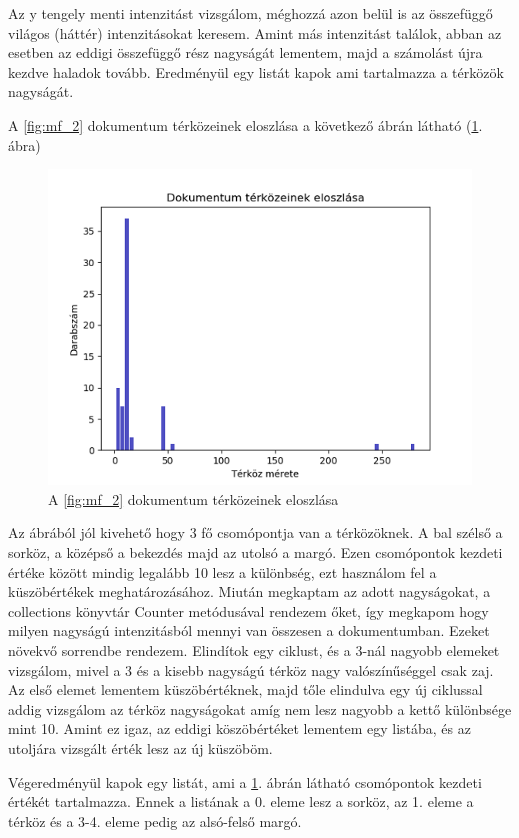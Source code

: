 Az y tengely menti intenzitást vizsgálom, méghozzá azon belül is az összefüggő világos (háttér) intenzitásokat keresem. Amint más intenzitást találok, abban az esetben az eddigi összefüggő rész nagyságát lementem, majd a számolást újra kezdve haladok tovább. Eredményül egy listát kapok ami tartalmazza a térközök nagyságát.

A \ref{fig:mf_2} dokumentum térközeinek eloszlása a következő ábrán látható (\ref{fig:spacing}. ábra)  

\begin{figure}[H]
\centering
\includegraphics[scale=1]{images/spacing.png}
\caption{A \ref{fig:mf_2} dokumentum térközeinek eloszlása}
\label{fig:spacing}
\end{figure}

Az ábrából jól kivehető hogy 3 fő csomópontja van a térközöknek. A bal szélső a sorköz, a középső a bekezdés majd az utolsó a margó. Ezen csomópontok kezdeti értéke között mindig legalább 10 lesz a  különbség, ezt használom fel a küszöbértékek meghatározásához. Miután megkaptam az adott nagyságokat, a collections könyvtár Counter metódusával rendezem őket, így megkapom hogy milyen nagyságú intenzitásból mennyi van összesen a dokumentumban. Ezeket növekvő sorrendbe rendezem. Elindítok egy ciklust, és a 3-nál nagyobb elemeket vizsgálom, mivel a 3 és a kisebb nagyságú térköz nagy valószínűséggel csak zaj. Az első elemet lementem küszöbértéknek, majd tőle elindulva egy új ciklussal addig vizsgálom az térköz nagyságokat amíg nem lesz nagyobb a kettő különbsége mint 10. Amint ez igaz, az eddigi köszöbértéket lementem egy listába, és az utoljára vizsgált érték lesz az új küszöböm.

Végeredményül kapok egy listát, ami a \ref{fig:spacing}. ábrán látható csomópontok kezdeti értékét tartalmazza. Ennek a listának a 0. eleme lesz a sorköz, az 1. eleme a térköz és a 3-4. eleme pedig az alsó-felső margó.      